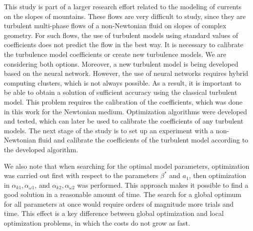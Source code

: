 \documentclass[mathematics,article,accept,pdftex,moreauthors]{Definitions/mdpi}
\begin{document}
\newpage

This study is part of a larger research effort related to the modeling of currents on the slopes of mountains. These flows are very difficult to study, since they are turbulent multi-phase flows of a non-Newtonian fluid on slopes of complex geometry. For such flows, the use of turbulent models using standard values of coefficients does not predict the flow in the best way. It is necessary to calibrate the turbulence model coefficients or create new turbulence models. We are considering both options. Moreover, a new turbulent model is being developed based on the neural network. However, the use of neural networks requires hybrid computing clusters, which is not always possible. As a result, it is important to be able to obtain a solution of sufficient accuracy using the classical turbulent model. This problem requires the calibration of the coefficients, which was done in this work for the Newtonian medium. Optimization algorithms were developed and tested, which can later be used to calibrate the coefficients of any turbulent models. The next stage of the study is to set up an experiment with a non-Newtonian fluid and calibrate the coefficients of the turbulent model according to the developed algorithm.

We also note that when searching for the optimal model parameters, optimization was carried out first with respect to the parameters $\beta^*$ and $a_1$, then optimization in $\alpha_{k1}, \alpha_{\omega1}$, and $\alpha_{k2}, \alpha_{\omega2}$ was performed. This approach makes it possible to find a good solution in a reasonable amount of time.
The search for a global optimum for all parameters at once would require orders of magnitude more trials and time.
This effect is a key difference between global optimization and local optimization problems, in which the costs do not grow as fast.
\end{document}
